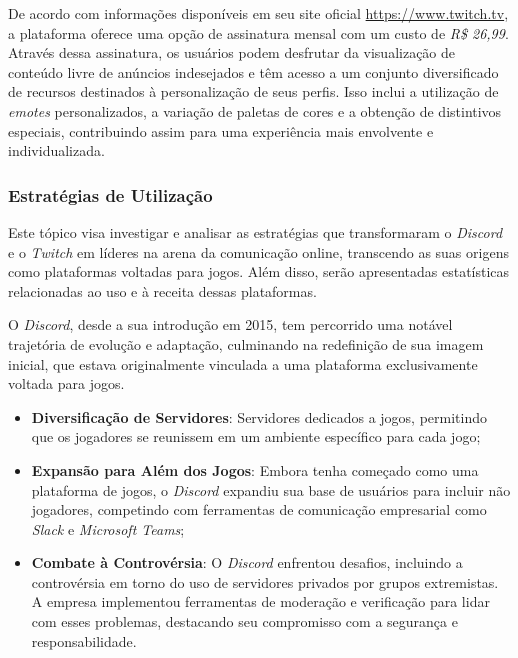 De acordo com informações disponíveis em seu site oficial \url{https://www.twitch.tv}, a plataforma oferece uma opção de assinatura mensal com um custo de \textit{R\$ 26,99}. Através dessa assinatura, os usuários podem desfrutar da visualização de conteúdo livre de anúncios indesejados e têm acesso a um conjunto diversificado de recursos destinados à personalização de seus perfis. Isso inclui a utilização de \textit{emotes} personalizados, a variação de paletas de cores e a obtenção de distintivos especiais, contribuindo assim para uma experiência mais envolvente e individualizada.

\subsubsection{Estratégias de Utilização}

Este tópico visa investigar e analisar as estratégias que transformaram o \textit{\gls{Discord}} e o \textit{\gls{Twitch}} em líderes na arena da comunicação online, transcendo as suas origens como plataformas voltadas para jogos. Além disso, serão apresentadas estatísticas relacionadas ao uso e à receita dessas plataformas.


O \textit{\gls{Discord}}, desde a sua introdução em 2015, tem percorrido uma notável trajetória de evolução e adaptação, culminando na redefinição de sua imagem inicial, que estava originalmente vinculada a uma plataforma exclusivamente voltada para jogos.

\begin{itemize}
    \item \textbf{Diversificação de Servidores}: Servidores dedicados a jogos, permitindo que os jogadores se reunissem em um ambiente específico para cada jogo;
    \item \textbf{Expansão para Além dos Jogos}: Embora tenha começado como uma plataforma de jogos, o \textit{\gls{Discord}} expandiu sua base de usuários para incluir não jogadores, competindo com ferramentas de comunicação empresarial como \textit{Slack} e \textit{Microsoft Teams};
    \item \textbf{Combate à Controvérsia}: O \textit{\gls{Discord}} enfrentou desafios, incluindo a controvérsia em torno do uso de servidores privados por grupos extremistas. A empresa implementou ferramentas de moderação e verificação para lidar com esses problemas, destacando seu compromisso com a segurança e responsabilidade.
\end{itemize}

